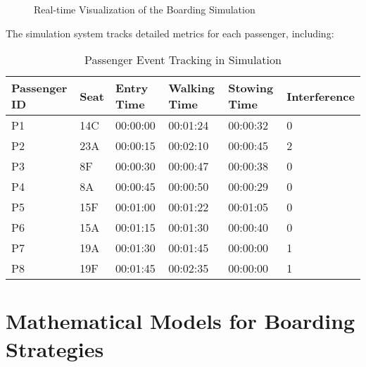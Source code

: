 \documentclass[12pt,a4paper]{article}
\begin{document}
\begin{figure}[H]
\caption{Real-time Visualization of the Boarding Simulation}
\label{fig:simulation_visualization}
\end{figure}

The simulation system tracks detailed metrics for each passenger, including:

\begin{table}[H]
\centering
\begin{tabular}{|l|l|l|l|l|l|}
\hline
\textbf{Passenger ID} & \textbf{Seat} & \textbf{Entry Time} & \textbf{Walking Time} & \textbf{Stowing Time} & \textbf{Interference} \\
\hline
P1 & 14C & 00:00:00 & 00:01:24 & 00:00:32 & 0 \\
P2 & 23A & 00:00:15 & 00:02:10 & 00:00:45 & 2 \\
P3 & 8F & 00:00:30 & 00:00:47 & 00:00:38 & 0 \\
P4 & 8A & 00:00:45 & 00:00:50 & 00:00:29 & 0 \\
P5 & 15F & 00:01:00 & 00:01:22 & 00:01:05 & 0 \\
P6 & 15A & 00:01:15 & 00:01:30 & 00:00:40 & 0 \\
P7 & 19A & 00:01:30 & 00:01:45 & 00:00:00 & 1 \\
P8 & 19F & 00:01:45 & 00:02:35 & 00:00:00 & 1 \\
\hline
\end{tabular}
\caption{Passenger Event Tracking in Simulation}
\label{tab:passenger_tracking}
\end{table}

\section{Mathematical Models for Boarding Strategies}
\end{document}
